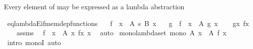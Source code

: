 \begin{isabellebody}
\endisatagproof
{\isafoldproof}%
%
\isadelimproof
%
\endisadelimproof
%
\begin{isamarkuptext}%
Every element of  may be expressed as a
lambda abstraction%
\end{isamarkuptext}\isamarkuptrue%
\isamarkupfalse%
\ eq{\isacharunderscore}{\kern0pt}lambdaE{\isacharunderscore}{\kern0pt}if{\isacharunderscore}{\kern0pt}mem{\isacharunderscore}{\kern0pt}dep{\isacharunderscore}{\kern0pt}functions{\isacharcolon}{\kern0pt}\isanewline
\ \ \ {\isachardoublequoteopen}f\ {\isasymin}\ {\isacharparenleft}{\kern0pt}x\ {\isasymin}\ A{\isacharparenright}{\kern0pt}\ {\isasymrightarrow}s\ {\isacharparenleft}{\kern0pt}B\ x{\isacharparenright}{\kern0pt}{\isachardoublequoteclose}\isanewline
\ \ \ g\ \ {\isachardoublequoteopen}f\ {\isacharequal}{\kern0pt}\ {\isacharparenleft}{\kern0pt}{\isasymlambda}x\ {\isasymin}\ A{\isachardot}{\kern0pt}\ g\ x{\isacharparenright}{\kern0pt}{\isachardoublequoteclose}\isanewline
%
\isadelimproof
%
\endisadelimproof
%
\isatagproof
{}\isamarkupfalse%
\isanewline
\ \ \isamarkupfalse%
\ {\isacharquery}{\kern0pt}g{\isacharequal}{\kern0pt}{\isachardoublequoteopen}{\isacharparenleft}{\kern0pt}{\isasymlambda}x{\isachardot}{\kern0pt}\ f{\isacharbackquote}{\kern0pt}x{\isacharparenright}{\kern0pt}{\isachardoublequoteclose}\isanewline
\ \ \isamarkupfalse%
\ assms\ \isamarkupfalse%
\ {\isachardoublequoteopen}f\ {\isacharequal}{\kern0pt}\ {\isacharparenleft}{\kern0pt}{\isasymlambda}x\ {\isasymin}\ A{\isachardot}{\kern0pt}\ {\isacharparenleft}{\kern0pt}{\isasymlambda}x{\isachardot}{\kern0pt}\ f{\isacharbackquote}{\kern0pt}x{\isacharparenright}{\kern0pt}\ x{\isacharparenright}{\kern0pt}{\isachardoublequoteclose}\ \isamarkupfalse%
\ auto\isanewline
{}\isamarkupfalse%
%
\endisatagproof
{\isafoldproof}%
%
\isadelimproof
\isanewline
%
\endisadelimproof
\isanewline
{}\isamarkupfalse%
\ mono{\isacharunderscore}{\kern0pt}lambda{\isacharunderscore}{\kern0pt}set{\isacharcolon}{\kern0pt}\ {\isachardoublequoteopen}mono\ {\isacharparenleft}{\kern0pt}{\isasymlambda}A{\isachardot}{\kern0pt}\ {\isasymlambda}x\ {\isasymin}\ A{\isachardot}{\kern0pt}\ f\ x{\isacharparenright}{\kern0pt}{\isachardoublequoteclose}\isanewline
%
\isadelimproof
\ \ %
\endisadelimproof
%
\isatagproof
{}\isamarkupfalse%
\ {\isacharparenleft}{\kern0pt}intro\ monoI{\isacharparenright}{\kern0pt}\ auto%
\endisatagproof
{\isafoldproof}%
%
\isadelimproof
\isanewline
%
\endisadelimproof
\isanewline
%
\isadelimtheory
\isanewline
%
\endisadelimtheory
%
\isatagtheory
{}\isamarkupfalse%
%
\endisatagtheory
{\isafoldtheory}%
%
\isadelimtheory
%
\endisadelimtheory
%
\end{isabellebody}%
